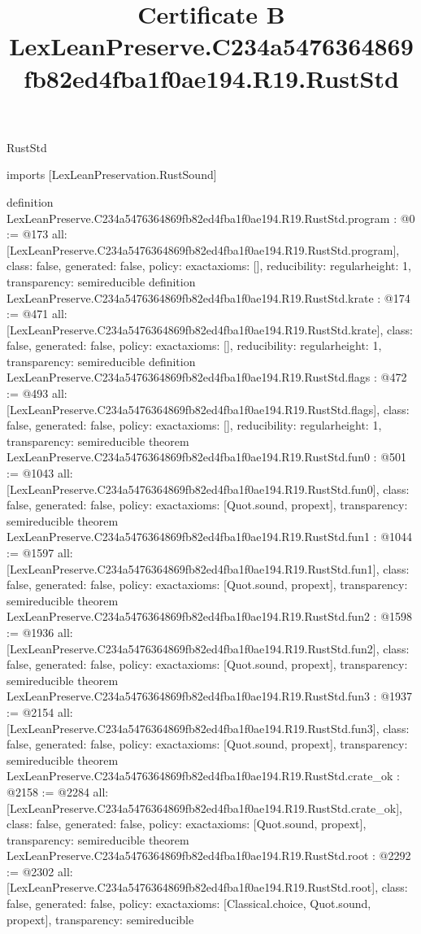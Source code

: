 \begin{lexlean}{RustStd}
\title{Certificate B LexLeanPreserve.C234a5476364869fb82ed4fba1f0ae194.R19.RustStd}
\begin{coremodule}
imports [LexLeanPreservation.RustSound]

definition LexLeanPreserve.C234a5476364869fb82ed4fba1f0ae194.R19.RustStd.program : @0 := @173 {
  all: [LexLeanPreserve.C234a5476364869fb82ed4fba1f0ae194.R19.RustStd.program],
  class: false,
  generated: false,
  policy: exact{axioms: []},
  reducibility: regular{height: 1},
  transparency: semireducible
}
definition LexLeanPreserve.C234a5476364869fb82ed4fba1f0ae194.R19.RustStd.krate : @174 := @471 {
  all: [LexLeanPreserve.C234a5476364869fb82ed4fba1f0ae194.R19.RustStd.krate],
  class: false,
  generated: false,
  policy: exact{axioms: []},
  reducibility: regular{height: 1},
  transparency: semireducible
}
definition LexLeanPreserve.C234a5476364869fb82ed4fba1f0ae194.R19.RustStd.flags : @472 := @493 {
  all: [LexLeanPreserve.C234a5476364869fb82ed4fba1f0ae194.R19.RustStd.flags],
  class: false,
  generated: false,
  policy: exact{axioms: []},
  reducibility: regular{height: 1},
  transparency: semireducible
}
theorem LexLeanPreserve.C234a5476364869fb82ed4fba1f0ae194.R19.RustStd.fun0 : @501 := @1043 {
  all: [LexLeanPreserve.C234a5476364869fb82ed4fba1f0ae194.R19.RustStd.fun0],
  class: false,
  generated: false,
  policy: exact{axioms: [Quot.sound, propext]},
  transparency: semireducible
}
theorem LexLeanPreserve.C234a5476364869fb82ed4fba1f0ae194.R19.RustStd.fun1 : @1044 := @1597 {
  all: [LexLeanPreserve.C234a5476364869fb82ed4fba1f0ae194.R19.RustStd.fun1],
  class: false,
  generated: false,
  policy: exact{axioms: [Quot.sound, propext]},
  transparency: semireducible
}
theorem LexLeanPreserve.C234a5476364869fb82ed4fba1f0ae194.R19.RustStd.fun2 : @1598 := @1936 {
  all: [LexLeanPreserve.C234a5476364869fb82ed4fba1f0ae194.R19.RustStd.fun2],
  class: false,
  generated: false,
  policy: exact{axioms: [Quot.sound, propext]},
  transparency: semireducible
}
theorem LexLeanPreserve.C234a5476364869fb82ed4fba1f0ae194.R19.RustStd.fun3 : @1937 := @2154 {
  all: [LexLeanPreserve.C234a5476364869fb82ed4fba1f0ae194.R19.RustStd.fun3],
  class: false,
  generated: false,
  policy: exact{axioms: [Quot.sound, propext]},
  transparency: semireducible
}
theorem LexLeanPreserve.C234a5476364869fb82ed4fba1f0ae194.R19.RustStd.crate_ok : @2158 := @2284 {
  all: [LexLeanPreserve.C234a5476364869fb82ed4fba1f0ae194.R19.RustStd.crate_ok],
  class: false,
  generated: false,
  policy: exact{axioms: [Quot.sound, propext]},
  transparency: semireducible
}
theorem LexLeanPreserve.C234a5476364869fb82ed4fba1f0ae194.R19.RustStd.root : @2292 := @2302 {
  all: [LexLeanPreserve.C234a5476364869fb82ed4fba1f0ae194.R19.RustStd.root],
  class: false,
  generated: false,
  policy: exact{axioms: [Classical.choice, Quot.sound, propext]},
  transparency: semireducible
}


\end{coremodule}
\end{lexlean}
